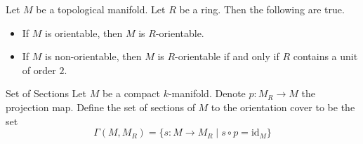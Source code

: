\documentclass[a4paper]{article}
\begin{document}
\begin{lmm}{}{} Let $M$ be a topological manifold. Let $R$ be a ring. Then the following are true. 
\begin{itemize}
\item If $M$ is orientable, then $M$ is $R$-orientable. 
\item If $M$ is non-orientable, then $M$ is $R$-orientable if and only if $R$ contains a unit of order $2$. 
\end{itemize}
\end{lmm}

\begin{defn}{Set of Sections}{} Let $M$ be a compact $k$-manifold. Denote $p:M_R\to M$ the projection map. Define the set of sections of $M$ to the orientation cover to be the set $$\Gamma(M,M_R)=\{s:M\to M_R\;|\;s\circ p=\text{id}_M\}$$
\end{defn}
\end{document}
